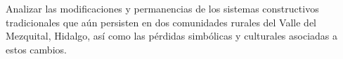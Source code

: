 



Analizar las modificaciones y permanencias de los sistemas constructivos tradicionales que aún persisten en dos comunidades rurales del Valle del Mezquital, Hidalgo, así como las pérdidas simbólicas y culturales asociadas a estos cambios.
